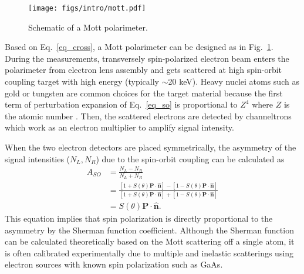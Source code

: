	\begin{figure}
	\centering
	\texttt{[image: figs/intro/mott.pdf]}
	\caption{Schematic of a Mott polarimeter.}
	\label{fig_mott}
	\end{figure}
	
	Based on Eq.~\ref{eq_cross}, a Mott polarimeter can be designed as in Fig.~\ref{fig_mott}. During the measurements, transversely spin-polarized electron beam enters the polarimeter from electron lens assembly and gets scattered at high spin-orbit coupling target with high energy (typically $\sim$20 keV).	Heavy nuclei atoms such as gold or tungsten are common choices for the target material because the first term of perturbation expansion of Eq.~\ref{eq_so} is proportional to $Z^4$ where $Z$ is the atomic number \cite{Jozwiak_thesis}. Then, the scattered electrons are detected by channeltrons which work as an electron multiplier to amplify signal intensity.
	

	
	When the two electron detectors are placed symmetrically, the asymmetry of the signal intensities ($N_L, N_R$) due to the spin-orbit coupling can be calculated as
	\begin{equation}
	\begin{aligned}
		A_{SO} & = \frac{N_L - N_R}{N_L + N_R} \\ 
	&	= \frac{[1 + S(\theta)\mathbf{P \cdot \hat{n}}] - [1 - S(\theta)\mathbf{P \cdot \hat{n}}] }{[1 + S(\theta)\mathbf{P \cdot \hat{n}}] + [1 - S(\theta)\mathbf{P \cdot \hat{n}}]} \\
	& = S(\theta)\mathbf{P \cdot \hat{n}}.
	\label{eq_asy_mott}
	\end{aligned}
	\end{equation}
	This equation implies that spin polarization is directly proportional to the asymmetry by the Sherman function coefficient. Although the Sherman function can be calculated theoretically based on the Mott scattering off a single atom, it is often calibrated experimentally due to multiple and inelastic scatterings using electron sources with known spin polarization such as GaAs.
	
